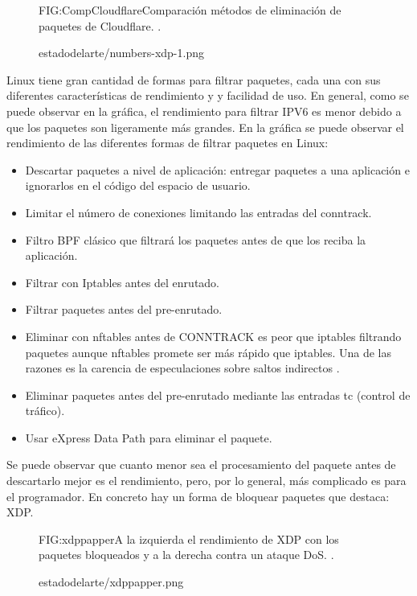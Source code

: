 \begin{figure}[Comparación métodos de eliminación de paquetes.]{FIG:CompCloudflare}{Comparación métodos de eliminación de paquetes de Cloudflare. \cite{CompCloudflare}.}
  \begin{image}{}{}{estadodelarte/numbers-xdp-1.png}
  \end{image}
\end{figure}

Linux tiene gran cantidad de formas para filtrar paquetes, cada una con sus diferentes características de rendimiento y y facilidad de uso. En general, como se puede observar en la gráfica, el rendimiento para filtrar IPV6 es menor debido a que los paquetes son ligeramente más grandes. En la gráfica se puede observar el rendimiento de las diferentes formas de filtrar paquetes en Linux:
\begin{itemize}
\item Descartar paquetes a nivel de aplicación: entregar paquetes a una aplicación e ignorarlos en el código del espacio de usuario.
\item Limitar el número de conexiones limitando las entradas del conntrack.
\item Filtro BPF clásico que filtrará los paquetes antes de que los reciba la aplicación.
\item Filtrar con Iptables antes del enrutado.
\item Filtrar paquetes antes del pre-enrutado.
\item Eliminar con nftables antes de CONNTRACK es peor que iptables filtrando paquetes aunque nftables promete ser más rápido que iptables. Una de las razones es la carencia de especulaciones sobre saltos indirectos \cite{expnftables}.
\item Eliminar paquetes antes del pre-enrutado mediante las entradas tc (control de tráfico).
\item Usar eXpress Data Path para eliminar el paquete.
\end{itemize}

Se puede observar que cuanto menor sea el procesamiento del paquete antes de descartarlo mejor es el rendimiento, pero, por lo general, más complicado es para el programador. En concreto hay un forma de bloquear paquetes que destaca: XDP.

\begin{figure}[Rendimiento de XDP filtrando.]{FIG:xdppapper}{A la izquierda el rendimiento de XDP con los paquetes bloqueados y a la derecha contra un ataque DoS. \cite{xdppapper}.}
  \begin{image}{}{}{estadodelarte/xdppapper.png}
  \end{image}
\end{figure}

